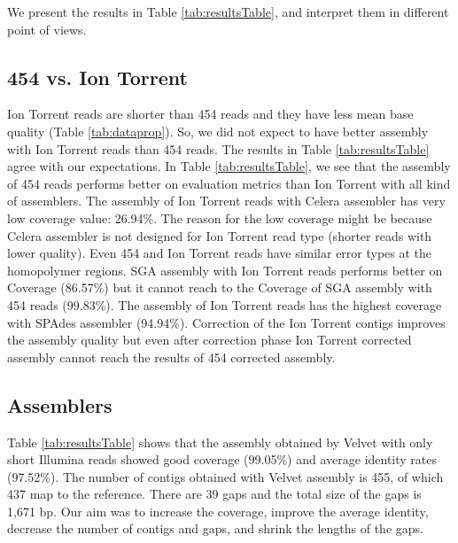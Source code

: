 \documentclass{llncs}
\begin{document}
We present the results in Table \ref{tab:resultsTable}, and interpret them in different point of views. 

\subsection{454 vs. Ion Torrent}
\label{454Ion}
Ion Torrent reads are shorter than 454 reads and they have less mean base quality (Table \ref{tab:dataprop}). So, we did not expect to have better assembly with Ion Torrent reads than 454 reads. The results in Table \ref{tab:resultsTable} agree with our expectations.
In Table \ref{tab:resultsTable}, we see that the assembly of 454 reads performs better on evaluation metrics than Ion Torrent with all kind of assemblers. The assembly of Ion Torrent reads with Celera assembler has very low coverage value: 26.94\%. The reason for the low coverage might be because Celera assembler is not designed for Ion Torrent read type (shorter reads with lower quality). Even 454 and Ion Torrent reads have similar error types at the homopolymer regions. SGA assembly with Ion Torrent reads performs better on Coverage (86.57\%) but it cannot reach to the Coverage of SGA assembly with 454 reads (99.83\%). The assembly of Ion Torrent reads has the highest coverage with SPAdes assembler (94.94\%). Correction of the Ion Torrent contigs improves the assembly quality but even after correction phase Ion Torrent corrected assembly cannot reach the results of 454 corrected assembly. 

\subsection{Assemblers}
\label{res_ass}
Table \ref{tab:resultsTable} shows that the assembly obtained by Velvet with only short Illumina reads showed good coverage  (99.05\%) and average identity rates (97.52\%). The number of contigs obtained with Velvet assembly is 455, of which 437 map to the reference. There are 39 gaps and the total size of the gaps is 1,671 bp. Our aim was to increase the coverage, improve the average identity, decrease the number of contigs and gaps, and shrink the lengths of the gaps.
\end{document}
